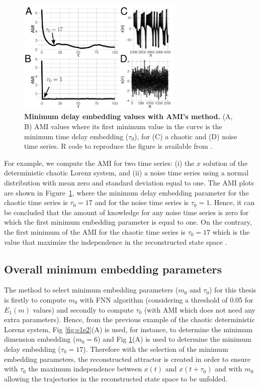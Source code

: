 \begin{figure}[!h]
  \centering
  \includegraphics[width=0.7\textwidth]{ami}
    \caption{
	{\bf Minimum delay embedding values with AMI's method.} 
    	(A, B) AMI values where its first minimum value in the curve
	is the minimum time delay embedding ($\tau_0$), 
	for (C) a chaotic and (D) noise time series.
	R code to reproduce the figure is available from \cite{hwum2018}.
        }
    \label{fig:amis}
\end{figure}
For example, we compute the AMI for two time series:
(i) the $x$ solution of the deterministic chaotic Lorenz system, and 
(ii) a noise time series using a normal distribution with mean zero and 
standard deviation equal to one. The AMI plots are shown in 
Figure~\ref{fig:amis}, where the minimum delay embedding parameter for 
the chaotic time series is $\tau_0=17$ and for the noise time series is  
$\tau_0=1$. Hence, it can be concluded that the amount of knowledge for 
any noise time series is zero for which the first minimum embedding 
parameter is equal to one. On the contrary, the first minimum of the AMI 
for the chaotic time series is $\tau_0=17$ which is the value that maximize 
the independence in the reconstructed state space \citep{bradley2015}.


\subsection{Overall minimum embedding parameters} \label{sec:overall_minMT}
The method to select minimum embedding parameters ($m_0$ and $\tau_0$) 
for this thesis is firstly to compute $m_0$ with FNN algorithm 
(considering a threshold of 0.05 for $E_1(m)$ values) and secondly
to compute $\tau_0$ (with AMI which does not need any extra parameters).
Hence, from the previous example of the chaotic deterministic 
Lorenz system, Fig \ref{fig:e1e2}(A) is used, for instance, to determine 
the minimum dimension embedding ($m_0 =6$) and 
Fig \ref{fig:amis}(A) is used to determine the minimum delay embedding 
($\tau_0 =17$).
Therefore with the selection of the minimum embedding parameters, the 
reconstructed attractor is created in order to ensure with $\tau_0$ the 
maximum independence between $x(t)$ and $x(t+\tau_0)$ and with $m_0$ 
allowing the trajectories in the reconstructed state space to be unfolded.

